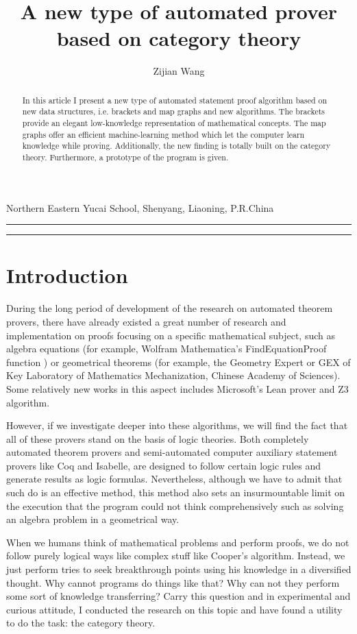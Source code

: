 \documentclass{article}
\begin{document}
\title{A new type of automated prover based on category theory}
\author{Zijian Wang}
\date{}
\maketitle

\begin{center}
Northern Eastern Yucai School, Shenyang, Liaoning, P.R.China
\end{center}

\hrule
\begin{abstract}
In this article I present a new type of automated statement proof algorithm based on new data structures, i.e. brackets and map graphs
and new algorithms. The brackets provide an elegant low-knowledge representation of mathematical concepts. The map graphs offer an efficient machine-learning method which let the computer learn knowledge while proving. Additionally, the new finding is totally built on the category theory. Furthermore, a prototype of the program is given.
\end{abstract}
\hrule

\section*{Introduction}
During the long period of development of the research on automated theorem provers, there have already existed a great number of research and implementation on proofs focusing on a specific mathematical subject, such as algebra equations (for example, Wolfram Mathematica{'}s FindEquationProof function \cite{2}) or geometrical theorems (for example, the Geometry Expert or GEX \cite{3} of Key Laboratory of Mathematics Mechanization, Chinese Academy of Sciences). Some relatively new works in this aspect includes Microsoft{'}s Lean prover and Z3 algorithm.

However, if we investigate deeper into these algorithms, we will find the fact that all of these provers stand on the basis of logic theories. Both completely automated theorem provers and semi-automated computer auxiliary statement provers like Coq and Isabelle, are designed to follow certain logic rules and generate results as logic formulas. Nevertheless, although we have to admit that such do is an effective method, this method also sets an insurmountable limit on the execution that the program could not think comprehensively such as solving an algebra problem in a geometrical way.

When we humans think of mathematical problems and perform proofs, we do not follow purely logical ways like complex stuff like Cooper{'}s algorithm. Instead, we just perform tries to seek breakthrough points using his knowledge in a diversified thought. Why cannot programs do things like that? Why can not they perform some sort of knowledge transferring? Carry this question and in experimental and curious attitude, I conducted the research on this topic and have found a utility to do the task: the category theory.
\end{document}

